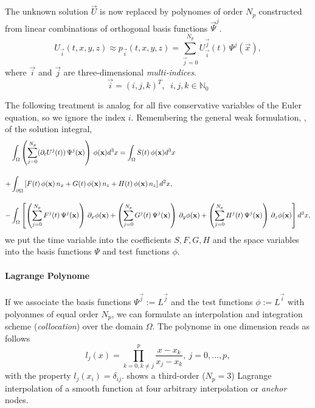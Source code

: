 The unknown solution $\vec{U}$ is now replaced by polynomes of order $N_p$
constructed from linear combinations of orthogonal basis functions
$\vec{\Psi}^j$.
\begin{equation}
    U_{\vec{i}}(t,x,y,z) \approx p_{\vec{i}}(t,x,y,z) = \sum^{N_p}_{\vec{j}=0} U^{\vec{j}}_{\vec{i}}(t) \, \Psi^j(\vec{x}),
\end{equation}
where $\vec{i}$ and $\vec{j}$ are three-dimensional \emph{multi-indices}.
\begin{equation}
    \vec{i} = (i,j,k)^T, \;\; i,j,k \in \mathbb{N}_0
\end{equation}

The following treatment is analog for all five conservative variables of the
Euler equation, so we ignore the index $i$. Remembering the general weak
formulation, , of the solution integral,
\begin{align}
\label{eqn:weak-formulation-galerkin}
    &\int_\Omega \left(\sum^{N_p}_{j=0} (\partial_t U^j(t)) \, \Psi^j(\vec{x})\right)\,\phi(\vec{x}) d^3x 
        = \int_\Omega S(t) \, \phi(\vec{x}) d^3x \nonumber \br
        +&\int_{\partial\Omega} \left[F(t)\,\phi(\vec{x})\,n_x + G(t)\,\phi(\vec{x})\,n_z + H(t)\,\phi(\vec{x})\,n_z \right] d^2x, \br
        -&\int_\Omega \left[
              \left(\sum^{N_p}_{j=0} F^j(t)\,\Psi^j(\vec{x})\right)\,\partial_x \phi(\vec{x}) 
            + \left(\sum^{N_p}_{j=0} G^j(t)\,\Psi^j(\vec{x})\right)\,\partial_y \phi(\vec{x})
            + \left(\sum^{N_p}_{j=0} H^j(t)\,\Psi^j(\vec{x})\right)\,\partial_z \phi(\vec{x}) \right] d^3x, \nonumber
\end{align}
we put the time variable into the coefficients $S,F,G,H$ and the space
variables into the basis functions $\Psi$ and test functions $\phi$.

\paragraph{Lagrange Polynome}
If we associate the basis functions $\Psi^{\vec{j}} := L^{\vec{j}}$ and the
test functions $\phi := L^{\vec{i}}$ with  polyonmes of equal
order $N_p$, we can formulate an interpolation and integration scheme
(\emph{collocation}) over the domain $\Omega$. The polynome in one dimension
reads as follows
\begin{equation}
l_j(x) = \prod^p_{k=0,k\neq j} \frac{x-x_k}{x_j-x_k}, \ j = 0,\dots,p,
\end{equation}
with the  property $l_j(x_i) = \delta_{ij}$.
 shows a third-order ($N_p = 3$)
Lagrange interpolation of a smooth function at four arbitrary
interpolation or \emph{anchor} nodes.

